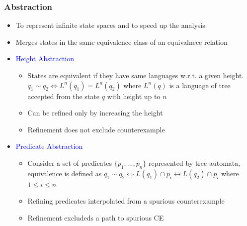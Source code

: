 \documentclass{beamer}
\newcommand{\hlbl}[1]{\textcolor{blue}{#1}}
\newcommand{\hlgr}[1]{\textcolor{olive!50!green}{#1}}
\begin{document}


\begin{frame}
\frametitle{Abstraction}

	\begin{itemize}
		\item To represent infinite state spaces and to speed up the analysis
		\item Merges states in the same equivalence class of
			an equivalnece relation
		\item \hlbl{Height Abstraction}
		\begin{itemize}
			\item States are equivalent if they have same languages w.r.t. a given height.
				\hlgr{$q_1 \sim q_2 \Leftrightarrow L^n(q_1) = L^n(q_2)$} where $L^n(q)$ is
				a language of tree accepted from the state $q$ with height up to $n$
			\item Can be refined only by increasing the height
			\item Refinement does not exclude counterexample
		\end{itemize}

	    \item \hlbl{Predicate Abstraction}
		\begin{itemize}
			\item Consider a set of predicates $\{p_1,\ldots,p_n\}$ represented by tree automata,
				equivalence is defined as \hlgr{$q_1 \sim q_2 \Leftrightarrow L(q_1) \cap p_i \leftrightarrow L(q_2) \cap p_i$}
				where $1 \leq i \leq n$
			\item Refining predicates interpolated from a spurious counterexample
			\item Refinement excludeds a path to spurious CE
		\end{itemize}
	\end{itemize}


\end{frame}

\end{document}
